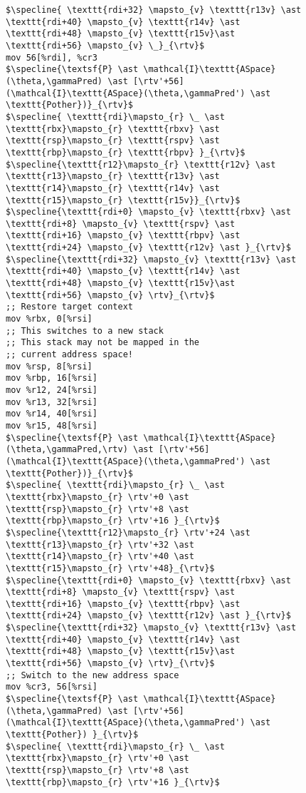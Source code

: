 \begin{figure}
\begin{lstlisting}
$\specline{ \texttt{rdi+32} \mapsto_{v} \texttt{r13v} \ast \texttt{rdi+40} \mapsto_{v} \texttt{r14v} \ast \texttt{rdi+48} \mapsto_{v} \texttt{r15v}\ast \texttt{rdi+56} \mapsto_{v} \_}_{\rtv}$
mov 56[%rdi], %cr3
$\specline{\textsf{P} \ast \mathcal{I}\texttt{ASpace}(\theta,\gammaPred) \ast [\rtv'+56](\mathcal{I}\texttt{ASpace}(\theta,\gammaPred') \ast \texttt{Pother})}_{\rtv}$
$\specline{ \texttt{rdi}\mapsto_{r} \_ \ast \texttt{rbx}\mapsto_{r} \texttt{rbxv} \ast  \texttt{rsp}\mapsto_{r} \texttt{rspv} \ast \texttt{rbp}\mapsto_{r} \texttt{rbpv} }_{\rtv}$
$\specline{\texttt{r12}\mapsto_{r} \texttt{r12v} \ast \texttt{r13}\mapsto_{r} \texttt{r13v} \ast \texttt{r14}\mapsto_{r} \texttt{r14v} \ast \texttt{r15}\mapsto_{r} \texttt{r15v}}_{\rtv}$
$\specline{\texttt{rdi+0} \mapsto_{v} \texttt{rbxv} \ast \texttt{rdi+8} \mapsto_{v} \texttt{rspv} \ast \texttt{rdi+16} \mapsto_{v} \texttt{rbpv} \ast \texttt{rdi+24} \mapsto_{v} \texttt{r12v} \ast }_{\rtv}$
$\specline{\texttt{rdi+32} \mapsto_{v} \texttt{r13v} \ast \texttt{rdi+40} \mapsto_{v} \texttt{r14v} \ast \texttt{rdi+48} \mapsto_{v} \texttt{r15v}\ast \texttt{rdi+56} \mapsto_{v} \rtv}_{\rtv}$    
;; Restore target context
mov %rbx, 0[%rsi] 
;; This switches to a new stack
;; This stack may not be mapped in the
;; current address space!
mov %rsp, 8[%rsi] 
mov %rbp, 16[%rsi]
mov %r12, 24[%rsi]
mov %r13, 32[%rsi]
mov %r14, 40[%rsi]
mov %r15, 48[%rsi]
$\specline{\textsf{P} \ast \mathcal{I}\texttt{ASpace}(\theta,\gammaPred,\rtv) \ast [\rtv'+56](\mathcal{I}\texttt{ASpace}(\theta,\gammaPred') \ast \texttt{Pother})}_{\rtv}$
$\specline{ \texttt{rdi}\mapsto_{r} \_ \ast \texttt{rbx}\mapsto_{r} \rtv'+0 \ast  \texttt{rsp}\mapsto_{r} \rtv'+8 \ast \texttt{rbp}\mapsto_{r} \rtv'+16 }_{\rtv}$
$\specline{\texttt{r12}\mapsto_{r} \rtv'+24 \ast \texttt{r13}\mapsto_{r} \rtv'+32 \ast \texttt{r14}\mapsto_{r} \rtv'+40 \ast \texttt{r15}\mapsto_{r} \rtv'+48}_{\rtv}$
$\specline{\texttt{rdi+0} \mapsto_{v} \texttt{rbxv} \ast \texttt{rdi+8} \mapsto_{v} \texttt{rspv} \ast \texttt{rdi+16} \mapsto_{v} \texttt{rbpv} \ast \texttt{rdi+24} \mapsto_{v} \texttt{r12v} \ast }_{\rtv}$
$\specline{\texttt{rdi+32} \mapsto_{v} \texttt{r13v} \ast \texttt{rdi+40} \mapsto_{v} \texttt{r14v} \ast \texttt{rdi+48} \mapsto_{v} \texttt{r15v}\ast \texttt{rdi+56} \mapsto_{v} \rtv}_{\rtv}$
;; Switch to the new address space
mov %cr3, 56[%rsi]
$\specline{\textsf{P} \ast \mathcal{I}\texttt{ASpace}(\theta,\gammaPred) \ast [\rtv'+56](\mathcal{I}\texttt{ASpace}(\theta,\gammaPred') \ast \texttt{Pother}) }_{\rtv}$
$\specline{ \texttt{rdi}\mapsto_{r} \_ \ast \texttt{rbx}\mapsto_{r} \rtv'+0 \ast  \texttt{rsp}\mapsto_{r} \rtv'+8 \ast \texttt{rbp}\mapsto_{r} \rtv'+16 }_{\rtv}$

\end{lstlisting}
\end{figure}
